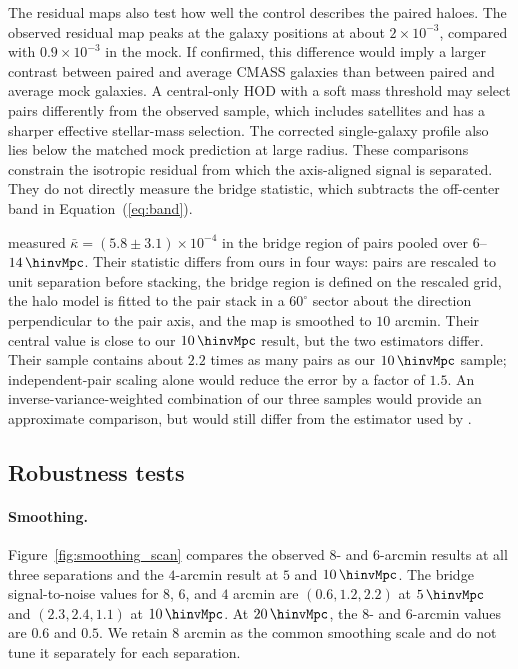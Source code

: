 The residual maps also test how well the control describes the paired haloes.
The observed residual map peaks at the galaxy positions at about
$2\times10^{-3}$, compared with $0.9\times10^{-3}$ in the mock.
If confirmed, this difference would imply a larger contrast between paired
and average CMASS galaxies than between paired and average mock galaxies. A
central-only HOD with a soft mass threshold may select pairs differently from
the observed sample, which includes satellites and has a sharper effective
stellar-mass selection. The corrected single-galaxy profile also lies below
the matched mock prediction at large radius.
These comparisons constrain the isotropic residual from which the
axis-aligned signal is separated. They do not directly measure the bridge
statistic, which subtracts the off-center band in Equation~(\ref{eq:band}).

\citet{deGraaff2019} measured
$\bar\kappa=(5.8\pm3.1)\times10^{-4}$ in the bridge region of pairs pooled
over $6$--$14\,\hinvMpc$. Their statistic differs from ours in four ways:
pairs are rescaled to unit separation before stacking, the bridge region is
defined on the rescaled grid, the halo model is fitted to the pair stack in
a $60^\circ$ sector about the direction perpendicular to the pair axis, and
the map is smoothed to $10$ arcmin. Their central value is close to our
$10\,\hinvMpc$ result, but the two estimators differ. Their
sample contains about $2.2$ times as many pairs as our $10\,\hinvMpc$
sample; independent-pair scaling alone would reduce the error by a factor of
$1.5$.
An inverse-variance-weighted combination of our three samples would provide
an approximate comparison, but would still differ from the estimator used by
\citet{deGraaff2019}.

\subsection{Robustness tests}
\label{sec:robust}

\paragraph{Smoothing.} Figure~\ref{fig:smoothing_scan} compares the observed
$8$- and $6$-arcmin results at all three separations and the $4$-arcmin
result at $5$ and $10\,\hinvMpc$. The bridge signal-to-noise values for
$8$, $6$, and $4$ arcmin are $(0.6,1.2,2.2)$ at $5\,\hinvMpc$ and
$(2.3,2.4,1.1)$ at $10\,\hinvMpc$. At $20\,\hinvMpc$, the $8$- and
$6$-arcmin values are $0.6$ and $0.5$. We retain $8$ arcmin as the common
smoothing scale and do not tune it separately for each separation.

